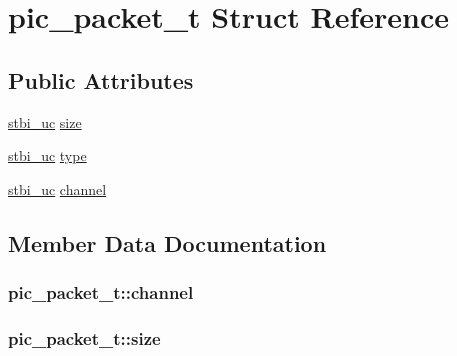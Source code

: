 \hypertarget{structpic__packet__t}{}\section{pic\+\_\+packet\+\_\+t Struct Reference}
\label{structpic__packet__t}
\subsection*{Public Attributes}
\begin{DoxyCompactItemize}
\item 
\hyperlink{stb__image_8h_a28eb51a1512ce382ee50f20e1d04d50d}{stbi\+\_\+uc} \hyperlink{structpic__packet__t_ad33021e40c272a20d89bdcceabb20a71}{size}
\item 
\hyperlink{stb__image_8h_a28eb51a1512ce382ee50f20e1d04d50d}{stbi\+\_\+uc} \hyperlink{structpic__packet__t_abc346cfdcff43f051830335296f14aaa}{type}
\item 
\hyperlink{stb__image_8h_a28eb51a1512ce382ee50f20e1d04d50d}{stbi\+\_\+uc} \hyperlink{structpic__packet__t_af64f17c991495f3f3baf6782a253f7cc}{channel}
\end{DoxyCompactItemize}


\subsection{Member Data Documentation}
\hypertarget{structpic__packet__t_af64f17c991495f3f3baf6782a253f7cc}{}
\subsubsection[{channel}]{ pic\+\_\+packet\+\_\+t\+::channel}\label{structpic__packet__t_af64f17c991495f3f3baf6782a253f7cc}
\hypertarget{structpic__packet__t_ad33021e40c272a20d89bdcceabb20a71}{}
\subsubsection[{size}]{ pic\+\_\+packet\+\_\+t\+::size}\label{structpic__packet__t_ad33021e40c272a20d89bdcceabb20a71}
\hypertarget{structpic__packet__t_abc346cfdcff43f051830335296f14aaa}{}
